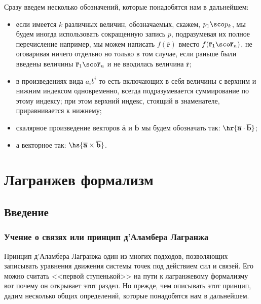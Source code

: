 \documentclass[a4paper,12pt]{article}
\newcommand{\vb}[1]{\mathbf{\overline{#1}}}
\newcommand{\spr}[2]{\hr{#1 \cdot #2}}
\newcommand{\vpr}[2]{\hs{#1 \times #2}}
\begin{document}
Сразу введем несколько обозначений, которые понадобятся нам в дальнейшем:
\begin{itemize}
  \item если имеется $k$ различных величин, обозначаемых, скажем, $p_1\sco
  p_k$, мы будем иногда использовать сокращенную запись $p$,
  подразумевая их полное перечисление например, мы можем написать
  $f(\vb{r})$ вместо $f(\vb{r}_1\sco\vb{r}_n)$, не оговаривая ничего
  отдельно но только в том случае, если раньше были введены
  величины $\vb{r}_1\sco\vb{r}_n$ и не вводилась величина $\vb{r}$;
  \item в произведениях вида $a_ib^i$ то есть включающих в себя
  величины с верхним и нижним индексом одновременно, всегда
  подразумевается суммирование по этому индексу; при этом верхний
  индекс, стоящий в знаменателе, приравнивается к нижнему;
  \item скалярное произведение векторов $\vb{a}$ и $\vb{b}$ мы будем обозначать
  так:
  $\spr{\vb{a}}{\vb{b}}$;
  \item а векторное так: $\vpr{\vb{a}}{\vb{b}}$.
\end{itemize}

\pagebreak

\section{Лагранжев формализм}

\subsection{Введение}

\subsubsection{Учение о связях или принцип д'Аламбера Лагранжа}

Принцип д'Аламбера Лагранжа один из многих подходов, позволяющих
записывать уравнения движения системы точек под действием сил и
связей. Его можно считать <<первой ступенькой>> на пути к лагранжевому
формализму вот почему он открывает этот раздел. Но прежде, чем
описывать этот принцип, дадим несколько общих определений, которые
понадобятся нам в дальнейшем.
\end{document}
